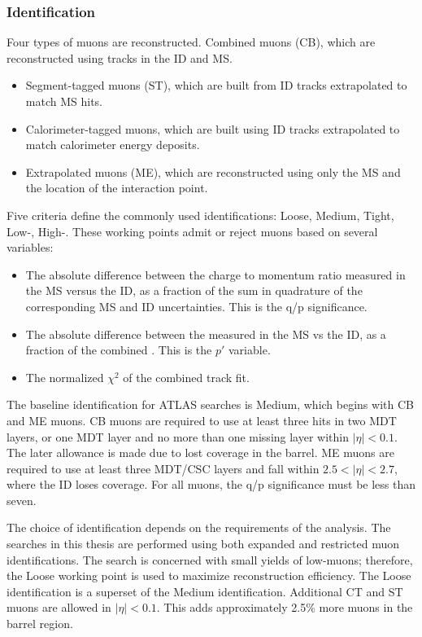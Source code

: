 \subsubsection{Identification}

Four types of muons are reconstructed.
Combined muons (CB), which are reconstructed using tracks in the ID and MS.
\begin{itemize}
\item Segment-tagged muons (ST), which are built from ID tracks extrapolated to match MS hits.
\item Calorimeter-tagged muons, which are built using ID tracks extrapolated to match calorimeter energy deposits.
\item Extrapolated muons (ME), which are reconstructed using only the MS and the location of the interaction point.
\end{itemize}

Five criteria define the commonly used identifications: Loose, Medium, Tight, Low-\pt, High-\pt.
These working points admit or reject muons based on several variables:
\begin{itemize}
    \item The absolute difference between the charge to momentum ratio measured in the MS versus the ID, as a fraction of the sum in quadrature of the corresponding MS and ID uncertainties. This is the q/p significance.
    \item The absolute difference between the \pt measured in the MS vs the ID, as a fraction of the combined \pt. This is the $p'$ variable.
    \item The normalized $\chi^2$ of the combined track fit.
\end{itemize}
The baseline identification for ATLAS searches is Medium, which begins with CB and ME muons.
CB muons are required to use at least three hits in two MDT layers, or one MDT layer and no more than one missing layer within $|\eta|<0.1$.
The later allowance is made due to lost coverage in the barrel.
ME muons are required to use at least three MDT/CSC layers and fall within $2.5<|\eta|<2.7$, where the ID loses coverage.
For all muons, the q/p significance must be less than seven.
\cite{muonReco}

The choice of identification depends on the requirements of the analysis.
The searches in this thesis are performed using both expanded and restricted muon identifications.
The \hmm search is concerned with small yields of low-\pt muons; therefore, the Loose working point is used to maximize reconstruction efficiency.
The Loose identification is a superset of the Medium identification.
Additional CT and ST muons are allowed in $|\eta|<0.1$. This adds approximately 2.5\% more muons in the barrel region.
\cite{muonReco}

